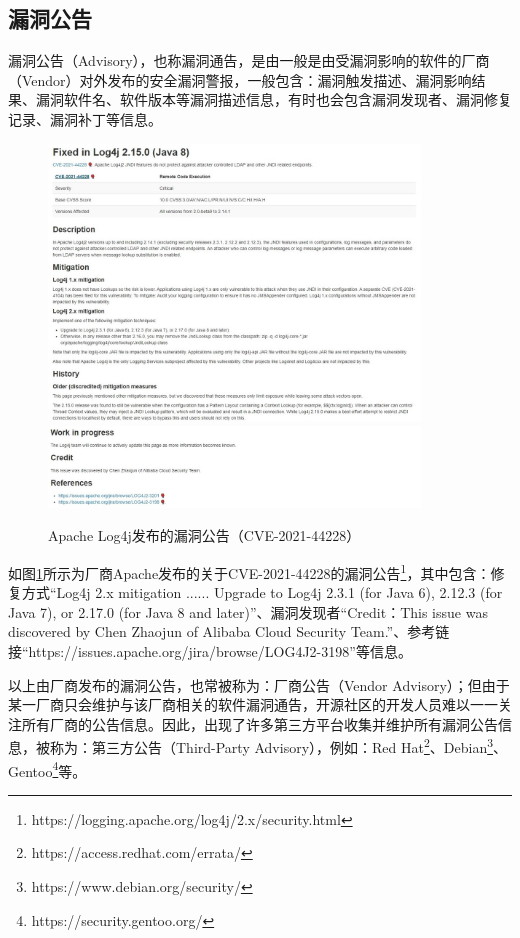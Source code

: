 \subsection{漏洞公告} 
漏洞公告（Advisory），也称漏洞通告，是由一般是由受漏洞影响的软件的厂商（Vendor）对外发布的安全漏洞警报，一般包含：漏洞触发描述、漏洞影响结果、漏洞软件名、软件版本等漏洞描述信息，有时也会包含漏洞发现者、漏洞修复记录、漏洞补丁等信息。

\begin{figure}[h]
    \centering
    \includegraphics[width=0.88\textwidth]{fig/Vendor-2021-44228}
    \includegraphics[width=0.88\textwidth]{fig/Vendor-2021-44228-2}
    \caption{Apache Log4j发布的漏洞公告（CVE-2021-44228）}
    \label{fig:Vendor-2021-44228}
\end{figure}

如图\ref{fig:Vendor-2021-44228}所示为厂商Apache发布的关于CVE-2021-44228的漏洞公告\footnote{https://logging.apache.org/log4j/2.x/security.html}，其中包含：修复方式“Log4j 2.x mitigation ...... Upgrade to Log4j 2.3.1 (for Java 6), 2.12.3 (for Java 7), or 2.17.0 (for Java 8 and later)”、漏洞发现者“Credit：This issue was discovered by Chen Zhaojun of Alibaba Cloud Security Team.”、参考链接“https://issues.apache.org/jira/browse/LOG4J2-3198”等信息。


以上由厂商发布的漏洞公告，也常被称为：厂商公告（Vendor Advisory）；但由于某一厂商只会维护与该厂商相关的软件漏洞通告，开源社区的开发人员难以一一关注所有厂商的公告信息。因此，出现了许多第三方平台收集并维护所有漏洞公告信息，被称为：第三方公告（Third-Party Advisory），例如：Red Hat\footnote{https://access.redhat.com/errata/}、Debian\footnote{https://www.debian.org/security/}、Gentoo\footnote{https://security.gentoo.org/}等。

